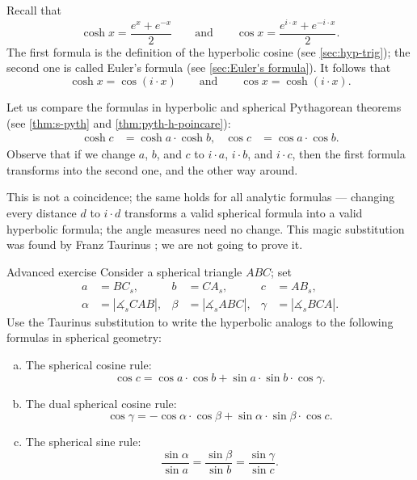 Recall that  
\[
\cosh x=\frac {e^{x}+e^{-x}}2
\qquad\text{and}\qquad
\cos x=\frac {e^{i\cdot x}+e^{-i\cdot x}}2.
\]
The first formula is the definition of the hyperbolic cosine (see \ref{sec:hyp-trig});
the second one is called Euler's formula (see \ref{sec:Euler's formula}).
It follows that 
\[\cosh x=\cos (i\cdot x)
\qquad\text{and}\qquad
\cos x=\cosh (i\cdot x).\]

Let us compare the formulas in hyperbolic and spherical Pythagorean theorems (see \ref{thm:s-pyth} and \ref{thm:pyth-h-poincare}):
\begin{align*}
\cosh c&=\cosh a\cdot \cosh b,
&
\cos c&=\cos a\cdot \cos b.
\end{align*}
Observe that if we change $a$, $b$, and $c$ to $i\cdot a$, $i\cdot b$, and $i\cdot c$,
then the first formula transforms into the second one, and the other way around.

This is not a coincidence;
the same holds for all analytic formulas ---
changing every distance $d$ to $i\cdot d$ transforms a valid spherical formula into a valid hyperbolic formula;
the angle measures need no change.
This magic substitution was found by Franz Taurinus \cite{taurinus}; we are not going to prove it.

\begin{thm}{Advanced exercise}\label{ex:taurinus}
Consider a spherical triangle $ABC$; set
\begin{align*}
a&=BC_s,& b&=CA_s,& c&=AB_s,
\\
\alpha&=|\measuredangle_sCAB|,& \beta&=|\measuredangle_sABC|,& \gamma&=|\measuredangle_sBCA|.
\end{align*}
Use the Taurinus substitution to write the hyperbolic analogs to the following formulas in spherical geometry:

\begin{enumerate}[(a)]
\item The spherical cosine rule:
\[\cos c=\cos a \cdot \cos b+\sin a\cdot \sin b\cdot \cos\gamma.\]
\item The dual spherical cosine rule:
\[\cos \gamma=-\cos \alpha \cdot \cos \beta+\sin \alpha\cdot \sin \beta \cdot \cos c.\]
\item
The spherical sine rule:
\[\frac{\sin \alpha}{\sin a}=\frac{\sin \beta}{\sin b}=\frac{\sin \gamma}{\sin c}.\]
\end{enumerate}
 
\end{thm}
